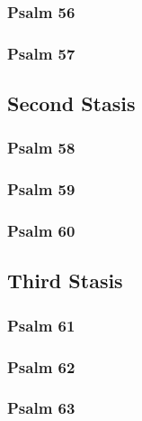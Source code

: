 \documentclass[12pt]{book}
\newcommand{\kathismabreak}{
  \medskip
  \begin{center}
  \begin{footnotesize}
  

  

  

  
  \end{footnotesize}
  \end{center}
  \smallbreak
}
\begin{document}
\subsubsection{Psalm 56}


\subsubsection{Psalm 57}


\kathismabreak

\subsection{Second Stasis}

\subsubsection{Psalm 58}


\subsubsection{Psalm 59}


\subsubsection{Psalm 60}


\kathismabreak

\pagebreak %
\subsection{Third Stasis}

\subsubsection{Psalm 61}


\subsubsection{Psalm 62}


\subsubsection{Psalm 63}

\end{document}
